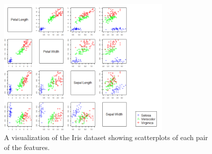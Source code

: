 \documentclass{article}
\begin{document}
\begin{figure}[H]
	\centering
	\includegraphics[width=0.75\textwidth]{iris_colored.png}
	\caption{A visualization of the Iris dataset showing scatterplots of each pair
	of the features.}
	\label{fig:iris_colored}
\end{figure}
\end{document}
